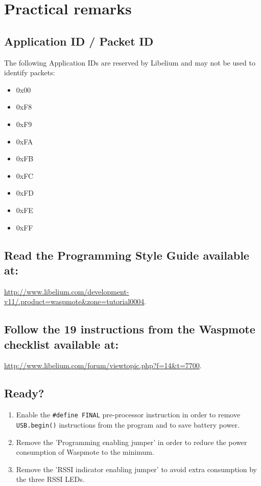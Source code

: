 \clearpage
\section{Practical remarks}
\label{AppendixG}
\subsection{Application ID / Packet ID}
The following Application IDs are reserved by Libelium and may not be used to identify packets:
\begin{itemize}
\item 0x00\\
\item 0xF8\\
\item 0xF9\\
\item 0xFA\\
\item 0xFB\\
\item 0xFC\\
\item 0xFD\\
\item 0xFE\\
\item 0xFF\\
\end{itemize}
\subsection{Read the Programming Style Guide available at:} 
\url{http://www.libelium.com/development-v11/.product=waspmote&zone=tutorial0004}.
\subsection{Follow the 19 instructions from the Waspmote checklist available at:}
\url{http://www.libelium.com/forum/viewtopic.php?f=14&t=7700}.
\subsection{Ready?}
\begin{enumerate}
\item Enable the \verb+#define FINAL+ pre-processor instruction in order to remove \verb+USB.begin()+ instructions from the program and to save battery power.
\item  Remove the 'Programming enabling jumper' in order to reduce the power consumption of Waspmote to the minimum.
\item Remove the 'RSSI indicator enabling jumper' to avoid extra consumption by the three RSSI LEDs.
\end{enumerate}
